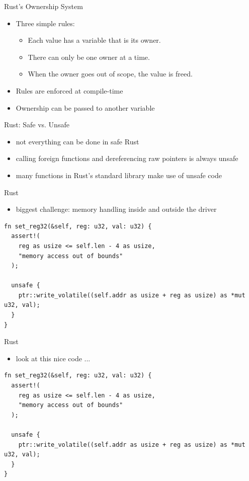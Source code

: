 \documentclass[NET,english,aspectratio=169,notitleframe]{tumbeamer}
\begin{document}
\begin{frame}{Rust's Ownership System}
\begin{itemize}
\item Three simple rules:
\begin{itemize}
\item Each value has a variable that is its owner.
\item There can only be one owner at a time.
\item When the owner goes out of scope, the value is freed.
\end{itemize}
\item Rules are enforced at compile-time
\item Ownership can be passed to another variable%
\end{itemize}
\end{frame}

\begin{frame}{Rust: Safe vs. Unsafe}
\begin{itemize}
\item not everything can be done in safe Rust
\item calling foreign functions and dereferencing raw pointers is always unsafe
\item many functions in Rust's standard library make use of unsafe code
\end{itemize}
\end{frame}

\begin{frame}[fragile]{Rust}
\begin{itemize}
\item biggest challenge: memory handling inside and outside the driver
\end{itemize}
\begin{verbatim}
fn set_reg32(&self, reg: u32, val: u32) {
  assert!(
    reg as usize <= self.len - 4 as usize,
    "memory access out of bounds"
  );

  unsafe {
    ptr::write_volatile((self.addr as usize + reg as usize) as *mut u32, val);
  }
}
\end{verbatim}
\end{frame}

\begin{frame}[fragile]{Rust}
\begin{itemize}
\item look at this nice code ...
\end{itemize}
\begin{verbatim}
fn set_reg32(&self, reg: u32, val: u32) {
  assert!(
    reg as usize <= self.len - 4 as usize,
    "memory access out of bounds"
  );

  unsafe {
    ptr::write_volatile((self.addr as usize + reg as usize) as *mut u32, val);
  }
}
\end{verbatim}
\end{frame}
\end{document}
